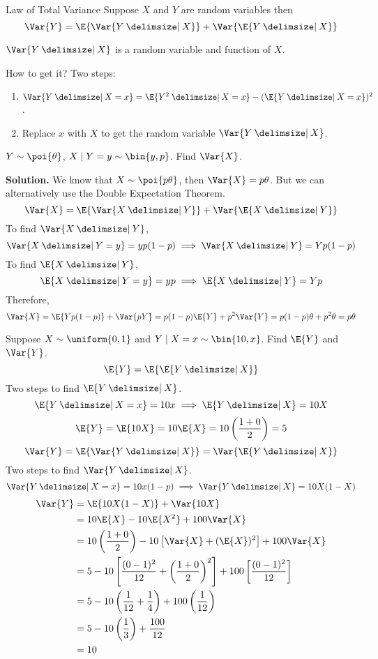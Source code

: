 \begin{Theorem}{Law of Total Variance}{}
    Suppose $ X $ and $ Y $ are random variables then
    \[ \Var{Y}=\E{\Var{Y\given X}}+\Var{\E{Y\given X}} \]
\end{Theorem}
\begin{Remark}{}{}
    $ \Var{Y\given X} $ is a random variable and function of $ X $.

    How to get it? Two steps:
    \begin{enumerate}
        \item $ \Var{Y\given X=x}=\E{Y^2\given X=x}-(\E{Y\given X=x})^2 $.
        \item Replace $ x $ with $ X $ to get
              the random variable $ \Var{Y\given X} $.
    \end{enumerate}
\end{Remark}
\begin{Example}{}{}
    $ Y \sim \poi{\theta} $, $ X\mid Y=y \sim \bin{y,p} $. Find
    $ \Var{X} $.

    \textbf{Solution.} We know that $ X \sim \poi{p\theta} $,
    then $ \Var{X}=p\theta $. But we can alternatively
    use the Double Expectation Theorem.
    \[ \Var{X}=\E{\Var{X\given Y}}+\Var{\E{X\given Y}} \]
    To find $ \Var{X\given Y} $,
    \[ \Var{X\given Y=y}=yp(1-p)\implies \Var{X\given Y}=Yp(1-p) \]
    To find $ \E{X\given Y} $,
    \[ \E{X\given Y=y}=yp\implies \E{X\given Y}=Yp \]
    Therefore,
    \[ \Var{X}=\E{Yp(1-p)}+\Var{pY}=p(1-p)\E{Y}+p^2\Var{Y}=
        p(1-p)\theta+p^2\theta=p\theta \]
\end{Example}
\begin{Example}{}{}
    Suppose $ X \sim \uniform{0,1} $ and
    $ Y\mid X=x \sim \bin{10,x} $. Find $ \E{Y} $
    and $ \Var{Y} $.
    \[ \E{Y}=\E{\E{Y\given X}} \]
    Two steps to find $ \E{Y\given X} $.
    \[ \E{Y\given X=x}=10x\implies \E{Y\given X}=10X \]
    \[ \E{Y}=\E{10X}=10\E{X}=10\left( \frac{1+0}{2} \right)=5 \]
    \[ \Var{Y}=\E{\Var{Y\given X}}=\Var{\E{Y\given X}} \]
    Two steps to find $ \Var{Y\given X} $.
    \[ \Var{Y\given X=x}=10x(1-p)\implies\Var{Y\given X}=10X(1-X) \]
    \begin{align*}
        \Var{Y}
         & =\E{10X(1-X)}+\Var{10X}                                                 \\
         & =10\E{X}-10\E{X^2}+100\Var{X}                                           \\
         & =10\left( \frac{1+0}{2} \right)-
        10\left[ \Var{X}+(\E{X})^2 \right]+100\Var{X}                              \\
         & =5-10\left[ \frac{(0-1)^2}{12}+\left( \frac{1+0}{2} \right)^2  \right]+
        100\left[ \frac{(0-1)^2}{12} \right]                                       \\
         & =5-10\left( \frac{1}{12} +\frac{1}{4}  \right)+
        100\left( \frac{1}{12} \right)                                             \\
         & =5-10\left( \frac{1}{3} \right)+\frac{100}{12}                          \\
         & =10
    \end{align*}
\end{Example}
